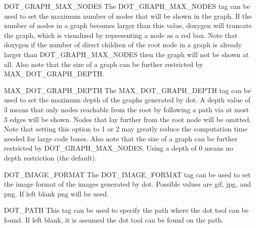 \begin{DoxyDescription}
\label{config_cfg_dot_graph_max_nodes}
\hypertarget{config_cfg_dot_graph_max_nodes}{}
 
\item[{\ttfamily DOT\_\-GRAPH\_\-MAX\_\-NODES} ] The {\ttfamily DOT\_\-GRAPH\_\-MAX\_\-NODES} tag can be used to set the maximum number of nodes that will be shown in the graph. If the number of nodes in a graph becomes larger than this value, doxygen will truncate the graph, which is visualized by representing a node as a red box. Note that doxygen if the number of direct children of the root node in a graph is already larger than {\ttfamily DOT\_\-GRAPH\_\-MAX\_\-NODES} then the graph will not be shown at all. Also note that the size of a graph can be further restricted by {\ttfamily MAX\_\-DOT\_\-GRAPH\_\-DEPTH}.

\label{config_cfg_max_dot_graph_depth}
\hypertarget{config_cfg_max_dot_graph_depth}{}
 
\item[{\ttfamily MAX\_\-DOT\_\-GRAPH\_\-DEPTH} ] The {\ttfamily MAX\_\-DOT\_\-GRAPH\_\-DEPTH} tag can be used to set the maximum depth of the graphs generated by dot. A depth value of 3 means that only nodes reachable from the root by following a path via at most 3 edges will be shown. Nodes that lay further from the root node will be omitted. Note that setting this option to 1 or 2 may greatly reduce the computation time needed for large code bases. Also note that the size of a graph can be further restricted by {\ttfamily DOT\_\-GRAPH\_\-MAX\_\-NODES}. Using a depth of 0 means no depth restriction (the default).

\label{config_cfg_dot_image_format}
\hypertarget{config_cfg_dot_image_format}{}
 
\item[{\ttfamily DOT\_\-IMAGE\_\-FORMAT} ] The {\ttfamily DOT\_\-IMAGE\_\-FORMAT} tag can be used to set the image format of the images generated by dot. Possible values are gif, jpg, and png. If left blank png will be used.

\label{config_cfg_dot_path}
\hypertarget{config_cfg_dot_path}{}
 
\item[{\ttfamily DOT\_\-PATH} ] This tag can be used to specify the path where the dot tool can be found. If left blank, it is assumed the dot tool can be found on the path.


\end{DoxyDescription}
